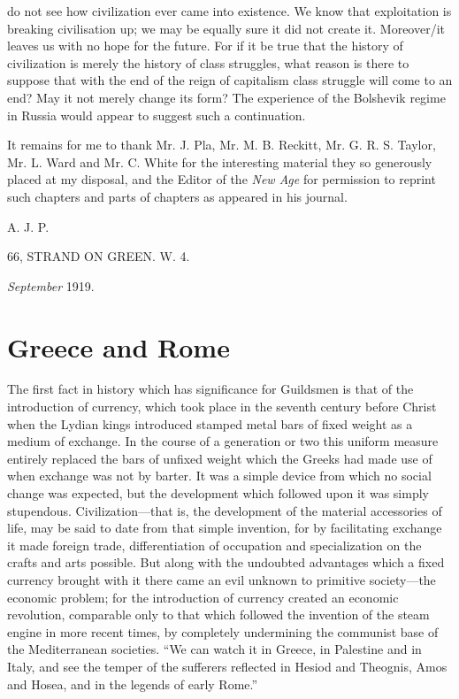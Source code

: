 \documentclass{book}
\begin{document}
do not see how civilization ever came into existence. We know that exploitation is breaking civilisation up; we may be equally sure it did not create it. Moreover/it leaves us with no hope for the future. For if it be true that the history of civilization is merely the history of class struggles, what reason is there to suppose that with the end of the reign of capitalism class struggle will come to an end? May it not merely change its form? The experience of the Bolshevik regime in Russia would appear to suggest such a continuation.

It remains for me to thank Mr. J. Pla, Mr. M. B. Reckitt, Mr. G. R. S. Taylor, Mr. L. Ward and Mr. C. White for the interesting material they so generously placed at my disposal, and the Editor of the \emph{New Age} for permission to reprint such chapters and parts of chapters as appeared in his journal.

A. J. P.

66, STRAND ON GREEN. W. 4.

\emph{September} 1919.

\chapter{Greece and Rome}
\label{chapter-1}
The first fact in history which has significance for Guildsmen is that of the introduction of currency, which took place in the seventh century before Christ when the Lydian kings introduced stamped metal bars of fixed weight as a medium of exchange. In the course of a generation or two this uniform measure entirely replaced the bars of unfixed weight which the Greeks had made use of when exchange was not by barter. It was a simple device from which no social change was expected, but the development which followed upon it was simply stupendous. Civilization—that is, the development of the material accessories of life, may be said to date from that simple invention, for by facilitating exchange it made foreign trade, differentiation of occupation and specialization on the crafts and arts possible. But along with the undoubted advantages which a fixed currency brought with it there came an evil unknown to primitive society—the economic problem; for the introduction of currency created an economic revolution, comparable only to that which followed the invention of the steam engine in more recent times, by completely undermining the communist base of the Mediterranean societies. “We can watch it in Greece, in Palestine and in Italy, and see the temper of the sufferers reflected in Hesiod and Theognis, Amos and Hosea, and in the legends of early Rome.”
\end{document}
